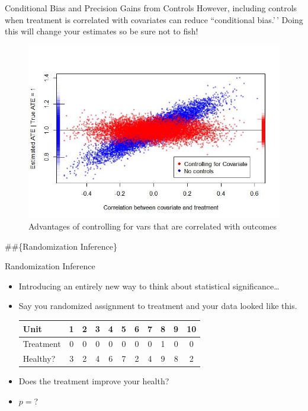 \documentclass[
  11pt,
  ignorenonframetext,
]{beamer}
\begin{document}
\begin{frame}{Conditional Bias and Precision Gains from Controls}
\protect\hypertarget{conditional-bias-and-precision-gains-from-controls-1}{}
However, including controls when treatment is correlated with covariates
can reduce ``conditional bias.'\,' Doing this will change your estimates
so be sure not to fish!

\begin{figure}
\centering
\includegraphics[width=0.7\linewidth]{figs/cb}
\caption{Advantages of controlling for vars that are correlated with outcomes}
\label{fig:cb}
\end{figure}

\#\#\{Randomization Inference\}\label{ri}
\end{frame}

\begin{frame}{Randomization Inference}
\protect\hypertarget{randomization-inference}{}
\begin{itemize}
    \item  Introducing an entirely new way to think about statistical significance\dots
    \item  Say you randomized assignment to treatment and your data looked like this.
\begin{table}
    \centering
        \begin{tabular}{l|cccccccccc}
        Unit            & 1&2&3&4&5&6&7&8&9&10\\ \hline
        Treatment & 0&0&0&0&0&0&0&1&0&0\\
        Healthy?    & 3&2&4&6&7&2&4&9&8&2\\ \hline          
        \end{tabular}
\end{table}
    \item Does the treatment improve your health?
    \item $p=$?
\end{itemize}
\end{frame}
\end{document}
